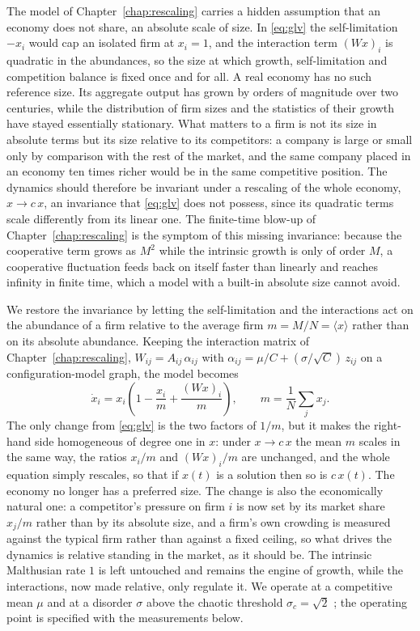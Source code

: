 The model of Chapter~\ref{chap:rescaling} carries a hidden assumption that an economy
does not share, an absolute scale of size. In \eqref{eq:glv} the self-limitation $-x_i$
would cap an isolated firm at $x_i = 1$, and the interaction term $(Wx)_i$ is quadratic
in the abundances, so the size at which growth, self-limitation and competition balance
is fixed once and for all. A real economy has no such reference size. Its aggregate
output has grown by orders of magnitude over two centuries, while the distribution of
firm sizes and the statistics of their growth have stayed essentially stationary. What
matters to a firm is not its size in absolute terms but its size relative to its
competitors: a company is large or small only by comparison with the rest of the market,
and the same company placed in an economy ten times richer would be in the same
competitive position. The dynamics should therefore be invariant under a rescaling of
the whole economy, $x \to c\,x$, an invariance that \eqref{eq:glv} does not possess,
since its quadratic terms scale differently from its linear one. The finite-time blow-up
of Chapter~\ref{chap:rescaling} is the symptom of this missing invariance: because the
cooperative term grows as $M^2$ while the intrinsic growth is only of order $M$, a
cooperative fluctuation feeds back on itself faster than linearly and reaches infinity
in finite time, which a model with a built-in absolute size cannot avoid.

We restore the invariance by letting the self-limitation and the interactions act on the
abundance of a firm relative to the average firm $m = M/N = \langle x\rangle$ rather than
on its absolute abundance. Keeping the interaction matrix of Chapter~\ref{chap:rescaling},
$W_{ij} = A_{ij}\,\alpha_{ij}$ with $\alpha_{ij} = \mu/C + (\sigma/\sqrt{C})\,z_{ij}$ on
a configuration-model graph, the model becomes
\begin{equation}
    \dot{x}_i = x_i \left( 1 - \frac{x_i}{m} + \frac{(Wx)_i}{m} \right),
    \qquad m = \frac{1}{N}\sum_j x_j .
    \label{eq:relative-glv}
\end{equation}
The only change from \eqref{eq:glv} is the two factors of $1/m$, but it makes the
right-hand side homogeneous of degree one in $x$: under $x \to c\,x$ the mean $m$ scales
in the same way, the ratios $x_i/m$ and $(Wx)_i/m$ are unchanged, and the whole equation
simply rescales, so that if $x(t)$ is a solution then so is $c\,x(t)$. The economy no
longer has a preferred size. The change is also the economically natural one: a
competitor's pressure on firm $i$ is now set by its market share $x_j/m$ rather than by
its absolute size, and a firm's own crowding is measured against the typical firm rather
than against a fixed ceiling, so what drives the dynamics is relative standing in the
market, as it should be. The intrinsic Malthusian rate $1$ is left untouched and remains
the engine of growth, while the interactions, now made relative, only regulate it. We
operate at a competitive mean $\mu$ and at a disorder $\sigma$ above the chaotic
threshold $\sigma_c = \sqrt{2}$ \citep{diederich1989}; the operating point is specified
with the measurements below.

